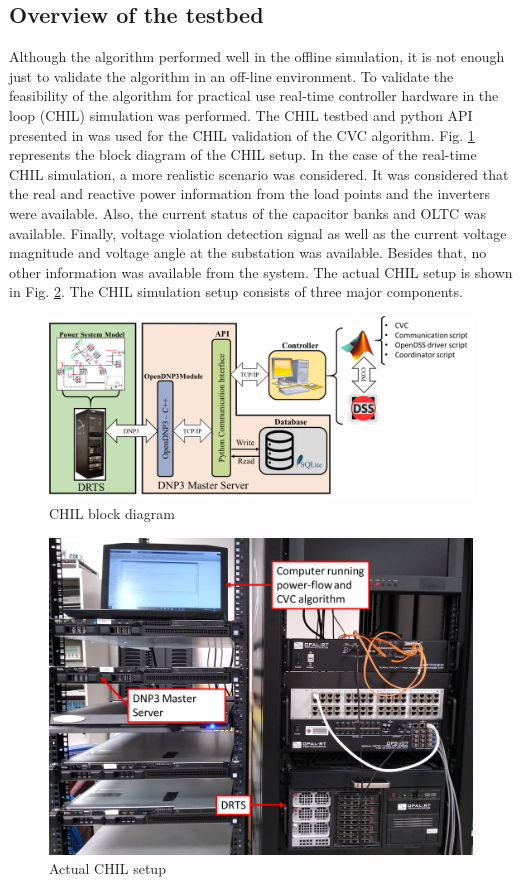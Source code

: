 \subsection{Overview of the testbed}
Although the algorithm performed well in the offline simulation, it is not enough just to validate the algorithm in an off-line environment. To validate the feasibility of the algorithm for practical use real-time controller hardware in the loop (CHIL) simulation was performed. The CHIL testbed and python API presented in \cite{newaz2019controller} was used for the CHIL validation of the CVC algorithm. Fig. \ref{fig:CHIL_BLOCK} represents the block diagram of the CHIL setup. In the case of the real-time CHIL simulation, a more realistic scenario was considered. It was considered that the real and reactive power information from the load points and the inverters were available. Also, the current status of the capacitor banks and OLTC was available. Finally, voltage violation detection signal as well as the current voltage magnitude and voltage angle at the substation was available. Besides that, no other information was available from the system. The actual CHIL setup is shown in Fig. \ref{fig:CHIL_SETUP}. The CHIL simulation setup consists of three major components.

\begin{figure}[!h]
\centering
\includegraphics[width=\linewidth]{figs/RT_BLOCK_2.png}
\caption{CHIL block diagram}
\label{fig:CHIL_BLOCK}
\end{figure}


\begin{figure}[!h]
\centering
\includegraphics[width=\linewidth]{figs/LAB_SETUP.png}
\caption{Actual CHIL setup}
\label{fig:CHIL_SETUP}
\end{figure}


